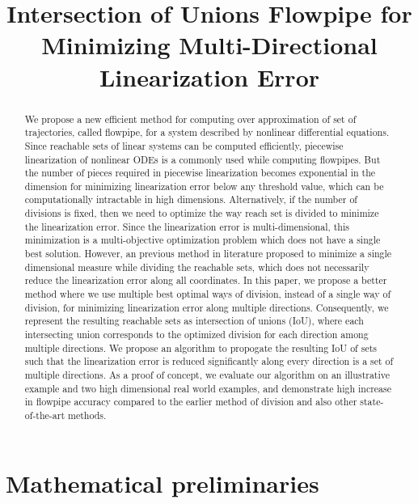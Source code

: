 


\title{Intersection of Unions Flowpipe for Minimizing Multi-Directional Linearization Error}
\author{}
\institute{}
%
    
\maketitle
%
\begin{abstract}
We propose a new efficient method for computing over approximation of
set of trajectories, called flowpipe, for a system described by
nonlinear differential equations.  Since reachable sets of linear
systems can be computed efficiently, piecewise linearization of
nonlinear ODEs is a commonly used while computing flowpipes.  But the
number of pieces required in piecewise linearization becomes
exponential in the dimension for minimizing linearization error below
any threshold value, which can be computationally intractable in high
dimensions.  Alternatively, if the number of divisions is fixed, then
we need to optimize the way reach set is divided to minimize the
linearization error.  Since the linearization error is
multi-dimensional, this minimization is a multi-objective optimization
problem which does not have a single best solution.  However, an
previous method in literature proposed to minimize a single
dimensional measure while dividing the reachable sets, which does not
necessarily reduce the linearization error along all coordinates.  In
this paper, we propose a better method where we use multiple best
optimal ways of division, instead of a single way of division, for
minimizing linearization error along multiple directions.
Consequently, we represent the resulting reachable sets as
intersection of unions (IoU), where each intersecting union
corresponds to the optimized division for each direction among
multiple directions.  We propose an algorithm to propogate the
resulting IoU of sets such that the linearization error is reduced
significantly along every direction is a set of multiple directions.
As a proof of concept, we evaluate our algorithm on an illustrative
example and two high dimensional real world examples, and demonstrate
high increase in flowpipe accuracy compared to the earlier method of division
and also other state-of-the-art methods.
\end{abstract}

\section{Mathematical preliminaries}

%

